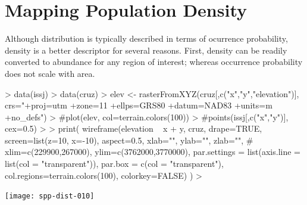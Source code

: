 \documentclass[a4paper]{article}
\renewenvironment{Schunk}{\vspace{\topsep}}{\vspace{\topsep}}
\begin{document}
\section*{Mapping Population Density}

Although distribution is typically described in terms of
ocurrence probability, density is a better descriptor for several
reasons. First, density can be readily converted to abundance for any
region of interest; whereas occurrence probability does not scale with
area.



\begin{Schunk}
\begin{Sinput}
> data(issj)
> data(cruz)
> elev <- rasterFromXYZ(cruz[,c("x","y","elevation")],
      crs="+proj=utm +zone=11 +ellps=GRS80 +datum=NAD83 +units=m +no_defs")
> #plot(elev, col=terrain.colors(100))
> #points(issj[,c("x","y")], cex=0.5)
> 
> print(
 wireframe(elevation ~ x + y, cruz, drape=TRUE,
           screen=list(z=10, x=-10),
           aspect=0.5, xlab="", ylab="", zlab="",
 #          xlim=c(229900,267000), ylim=c(3762000,3770000),
           par.settings = list(axis.line = list(col = "transparent")),
           par.box = c(col = "transparent"),
           col.regions=terrain.colors(100),
           colorkey=FALSE)
 )
> 
\end{Sinput}
\end{Schunk}
\texttt{[image: spp-dist-010]}
\end{document}
